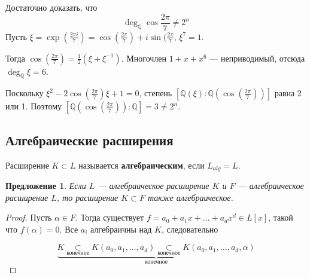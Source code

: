 \documentclass[a4paper]{article}
\newcommand{\Q}{\ensuremath{\mathbb{Q}}}
\numberwithin{theorem}{section}
\numberwithin{lemma}{section}
\newtheorem{proposition}{Предложение}
\numberwithin{proposition}{section}
\numberwithin{corollary}{section}
\begin{document}
\begin{minipage}{0.35\linewidth}
\centering
{}
\end{minipage}
\begin{minipage}{0.6\linewidth}
Достаточно доказать, что \[\deg_\Q \cos \frac{2\pi}{7} \ne 2^n \]
Пусть $\xi = \exp(\frac{2\pi i}{7}) = \cos(\frac{2\pi}{7}) + i \sin(\frac{2\pi}{7}$, $\xi^7=1$.

Тогда $\cos(\frac{2\pi}{7}) = \frac{1}{2}(\xi + \xi^{-1})$. Многочлен $1+x+x^6$ --- неприводимый, отсюда $\deg_\Q \xi = 6$.

Поскольку $\xi^2 - 2 \cos (\frac{2\pi}{7})\xi + 1 = 0$, степень
$[\Q(\xi) : \Q(\cos (\frac{2\pi}{7}))]$ равна 2 или 1.
Поэтому $[\Q(\cos (\frac{2\pi}{7})) : \Q] = 3 \ne 2^n$.
\end{minipage}

\subsection*{Алгебраические расширения}
Расширение $K \subset L$ называется \textbf{алгебраическим}, если $L_{alg} = L$.

\begin{proposition}
Если $L$ --- алгебраическое расширение $K$ и $F$ --- алгебраическое расширение $L$,
то расширение $K \subset F$ также алгебраическое.
\end{proposition}

\begin{proof}
Пусть $\alpha \in F$.
Тогда существует $f = a_0 + a_1 x + \ldots + a_d x^d \in L[x]$, такой что $f(\alpha) = 0$.
Все $a_i$ алгебраичны над $K$, следовательно

\[\underbrace{K \underset{\text{конечное}}{\subset} K(a_0, a_1, \ldots, a_d)
                \underset{\text{конечное}}{\subset} K(a_0, a_1, \ldots, a_d, \alpha)}_{\text{конечное}}\]
\end{proof}
\end{document}
